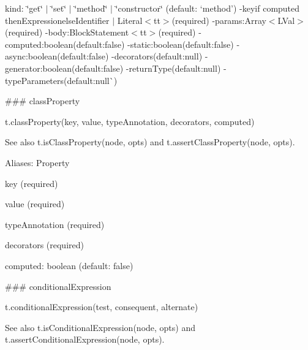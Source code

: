 \begin{DoxyItemize}
\item {\ttfamily kind}\+: {\ttfamily \char`\"{}get\char`\"{} $\vert$ \char`\"{}set\char`\"{} $\vert$ \char`\"{}method\char`\"{} $\vert$ \char`\"{}constructor\char`\"{}} (default\+: `\textquotesingle{}method'{\ttfamily ) -\/}key{\ttfamily if computed then}Expression{\ttfamily else}Identifier $\vert$ Literal$<$tt$>$(required) -\/params{\ttfamily \+:}Array$<$\+L\+Val$>${\ttfamily (required) -\/}body{\ttfamily \+:}Block\+Statement$<$tt$>$(required) -\/computed{\ttfamily \+:}boolean{\ttfamily (default\+:}false{\ttfamily ) -\/}static{\ttfamily \+:}boolean{\ttfamily (default\+:}false{\ttfamily ) -\/}async{\ttfamily \+:}boolean{\ttfamily (default\+:}false{\ttfamily ) -\/}decorators{\ttfamily (default\+:}null{\ttfamily ) -\/}generator{\ttfamily \+:}boolean{\ttfamily (default\+:}false{\ttfamily ) -\/}return\+Type{\ttfamily (default\+:}null{\ttfamily ) -\/}type\+Parameters{\ttfamily (default\+:}null\`{}) 


\end{DoxyItemize}

\#\#\# class\+Property 
\begin{DoxyCode}
t.classProperty(key, value, typeAnnotation, decorators, computed)
\end{DoxyCode}


See also {\ttfamily t.\+is\+Class\+Property(node, opts)} and {\ttfamily t.\+assert\+Class\+Property(node, opts)}.

Aliases\+: {\ttfamily Property}


\begin{DoxyItemize}
\item {\ttfamily key} (required)
\item {\ttfamily value} (required)
\item {\ttfamily type\+Annotation} (required)
\item {\ttfamily decorators} (required)
\item {\ttfamily computed}\+: {\ttfamily boolean} (default\+: {\ttfamily false}) 


\end{DoxyItemize}

\#\#\# conditional\+Expression 
\begin{DoxyCode}
t.conditionalExpression(test, consequent, alternate)
\end{DoxyCode}


See also {\ttfamily t.\+is\+Conditional\+Expression(node, opts)} and {\ttfamily t.\+assert\+Conditional\+Expression(node, opts)}.

